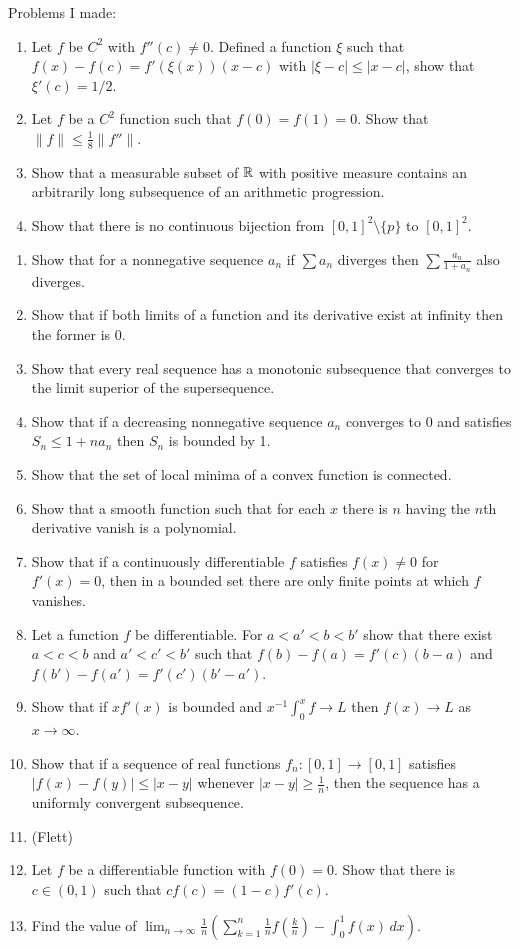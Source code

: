 \documentclass{article}
\begin{document}
Problems I made:
\begin{enumerate}
\item Let $f$ be $C^2$ with $f''(c)\ne0$. Defined a function $\xi$ such that $f(x)-f(c)=f'(\xi(x))(x-c)$ with $|\xi-c|\le|x-c|$, show that $\xi'(c)=1/2$.
\item Let $f$ be a $C^2$ function such that $f(0)=f(1)=0$. Show that $\|f\|\le\frac18\|f''\|$.
\item Show that a measurable subset of $\mathbb{R}$ with positive measure contains an arbitrarily long subsequence of an arithmetic progression.
\item Show that there is no continuous bijection from $[0,1]^2\setminus\{p\}$ to $[0,1]^2$. %
\end{enumerate}
\bigskip
\begin{enumerate}
\item Show that for a nonnegative sequence $a_n$ if $\sum a_n$ diverges then $\sum\frac{a_n}{1+a_n}$ also diverges.
\item Show that if both limits of a function and its derivative exist at infinity then the former is 0.
\item Show that every real sequence has a monotonic subsequence that converges to the limit superior of the supersequence.
\item Show that if a decreasing nonnegative sequence $a_n$ converges to 0 and satisfies $S_n\le1+na_n$ then $S_n$ is bounded by 1.
\item Show that the set of local minima of a convex function is connected.
\item Show that a smooth function such that for each $x$ there is $n$ having the $n$th derivative vanish is a polynomial.
\item Show that if a continuously differentiable $f$ satisfies $f(x)\ne0$ for $f'(x)=0$, then in a bounded set there are only finite points at which $f$ vanishes.
\item Let a function $f$ be differentiable. For $a<a'<b<b'$ show that there exist $a<c<b$ and $a'<c'<b'$ such that $f(b)-f(a)=f'(c)(b-a)$ and $f(b')-f(a')=f'(c')(b'-a')$.
\item Show that if $xf'(x)$ is bounded and $x^{-1}\int_0^xf\to L$ then $f(x)\to L$ as $x\to\infty$.
\item Show that if a sequence of real functions $f_n\colon[0,1]\to[0,1]$ satisfies $|f(x)-f(y)|\le|x-y|$ whenever $|x-y|\ge\frac1n$, then the sequence has a uniformly convergent subsequence.
\item (Flett)
\item Let $f$ be a differentiable function with $f(0)=0$. Show that there is $c\in(0,1)$ such that $cf(c)=(1-c)f'(c)$.
\item Find the value of $\lim_{n\to\infty}\frac1n\left(\sum_{k=1}^n\frac1nf\left(\frac kn\right)-\int_0^1f(x)\,dx\right)$.


\end{enumerate}
\end{document}
